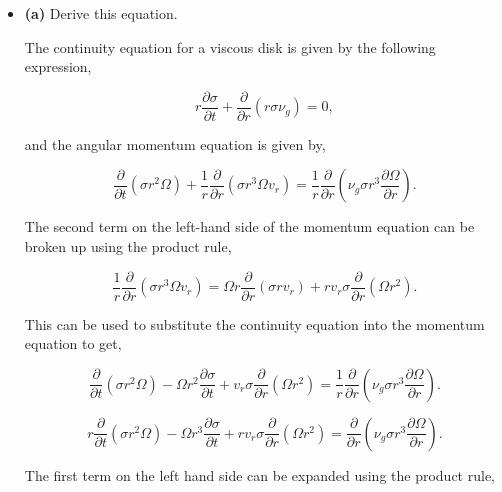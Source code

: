 \documentclass[12pt]{article}
\begin{document}
\begin{itemize}
\item \textbf{(a)} Derive this equation.

The continuity equation for a viscous disk is given by the following expression,

\begin{equation}
r\frac{\partial \sigma}{\partial t} + \frac{\partial}{\partial r}(r \sigma \nu_g) = 0,
\end{equation}

and the angular momentum equation is given by,

\begin{equation}
\frac{\partial}{\partial t}\left( \sigma r^2 \Omega \right) + \frac{1}{r}\frac{\partial}{\partial r}\left(\sigma r^3 \Omega v_r\right) = \frac{1}{r} \frac{\partial}{\partial r}\left(\nu_g\sigma r^3 \frac{\partial \Omega}{\partial r}\right).
\end{equation}

The second term on the left-hand side of the momentum equation can be broken up using the product rule,

\begin{equation}
\frac{1}{r}\frac{\partial}{\partial r}\left(\sigma r^3 \Omega v_r\right) = \Omega r\frac{\partial}{\partial r}\left(\sigma r v_r\right)  + rv_r\sigma \frac{\partial}{\partial r}\left(\Omega r^2\right).
\end{equation}

This can be used to substitute the continuity equation into the momentum equation to get,

\begin{equation}
\frac{\partial}{\partial t}\left(\sigma r^2 \Omega\right) - \Omega r^2 \frac{\partial \sigma}{\partial t} + v_r\sigma \frac{\partial}{\partial r}\left(\Omega r^2\right) = \frac{1}{r} \frac{\partial}{\partial r}\left(\nu_g\sigma r^3 \frac{\partial \Omega}{\partial r}\right).
\end{equation}

\begin{equation}
r\frac{\partial}{\partial t}\left(\sigma r^2 \Omega\right) - \Omega r^3 \frac{\partial \sigma}{\partial t} + rv_r\sigma \frac{\partial}{\partial r}\left(\Omega r^2\right) = \frac{\partial}{\partial r}\left(\nu_g\sigma r^3 \frac{\partial \Omega}{\partial r}\right).
\end{equation}

The first term on the left hand side can be expanded using the product rule,


\end{itemize}
\end{document}

